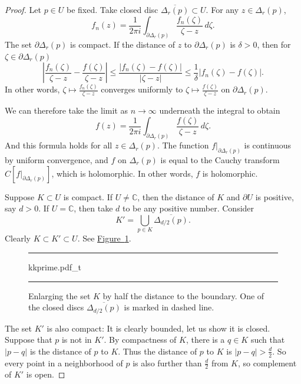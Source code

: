 \documentclass[12pt,openany]{book}
\newcommand{\sabs}[1]{\lvert {#1} \rvert}
\newcommand{\abs}[1]{\left\lvert {#1} \right\rvert}
\newcommand{\C}{{\mathbb{C}}}
\theoremstyle{plain}
\theoremstyle{remark}
\theoremstyle{definition}
\newenvironment{myfig}{%
\begin{figure}[h!t]
\noindent\rule{\textwidth}{0.4pt}\vspace{12pt}\par\centering}%
{\par\noindent\rule{\textwidth}{0.4pt}
\end{figure}}
\theoremstyle{exercise}
\theoremstyle{example}
\newcommand{\figureref}[1]{\hyperref[#1]{Figure~\ref*{#1}}}
\begin{document}
\begin{proof}
Let $p \in U$ be fixed.  Take closed disc $\overline{\Delta_r(p)} \subset
U$.  For any $z \in \Delta_r(p)$,
\begin{equation*}
f_n(z) = \frac{1}{2\pi i}
\int_{\partial \Delta_r(p)} \frac{f_n(\zeta)}{\zeta-z} \, d\zeta .
\end{equation*}
The set $\partial \Delta_r(p)$ is compact.  If the distance of $z$ to
$\partial \Delta_r(p)$ is $\delta > 0$, then for $\zeta \in \partial
\Delta_r(p)$
\begin{equation*}
\abs{\frac{f_n(\zeta)}{\zeta-z}
-
\frac{f(\zeta)}{\zeta-z}
}
\leq
\frac{\sabs{f_n(\zeta)-f(\zeta)}}{\sabs{\zeta-z}}
\leq
\frac{1}{\delta}
\sabs{f_n(\zeta)-f(\zeta)} .
\end{equation*}
In other words,
$\zeta \mapsto \frac{f_n(\zeta)}{\zeta-z}$ converges uniformly to 
$\zeta \mapsto \frac{f(\zeta)}{\zeta-z}$ on $\partial \Delta_r(p)$.

We can therefore take the limit as $n \to \infty$ underneath the integral
to obtain
\begin{equation*}
f(z) = \frac{1}{2\pi i}
\int_{\partial \Delta_r(p)} \frac{f(\zeta)}{\zeta-z} \, d\zeta .
\end{equation*}
And this formula holds for all $z \in \Delta_r(p)$.
The function $f|_{\partial \Delta_r(p)}$ is continuous by uniform
convergence, and $f$ on $\Delta_r(p)$ is equal to
the Cauchy transform
$C[f|_{\partial \Delta_r(p)}]$, which is holomorphic.  In other words,
$f$ is holomorphic.

Suppose $K \subset U$ is compact.  If $U \not= \C$, then the distance of
$K$ and $\partial U$ is positive, say $d > 0$.  If $U=\C$, then take $d$ to be any positive number.  Consider 
\begin{equation*}
K' = \bigcup_{p \in K} \overline{\Delta_{d/2}(p)} .
\end{equation*}
Clearly $K \subset K' \subset U$.
See \figureref{fig:kkprime}.

\begin{myfig}
{kkprime.pdf_t}
\caption{Enlarging the set $K$ by half the distance to the boundary.  One of
the closed discs $\overline{\Delta_{d/2}(p)}$ is marked in dashed line.\label{fig:kkprime}}
\end{myfig}

The set $K'$ is also compact: It is clearly
bounded, let us show it is closed.  Suppose that $p$ is not in $K'$.
By compactness of $K$, there is a $q \in K$ such that $\sabs{p-q}$
is the distance of $p$ to $K$.  Thus the
distance of $p$ to $K$ is $\sabs{p-q} > \frac{d}{2}$.
So every point in a neighborhood of $p$
is also further than $\frac{d}{2}$ from $K$, so
complement of $K'$ is open.


\end{proof}
\end{document}
